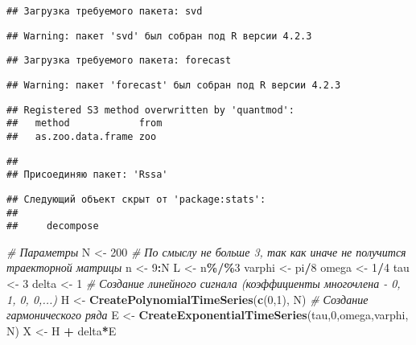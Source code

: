 \documentclass[
]{article}
\newenvironment{Shaded}{\begin{snugshade}}{\end{snugshade}}
\newcommand{\CommentTok}[1]{\textcolor[rgb]{0.56,0.35,0.01}{\textit{#1}}}
\newcommand{\DecValTok}[1]{\textcolor[rgb]{0.00,0.00,0.81}{#1}}
\newcommand{\FunctionTok}[1]{\textcolor[rgb]{0.13,0.29,0.53}{\textbf{#1}}}
\newcommand{\NormalTok}[1]{#1}
\newcommand{\OtherTok}[1]{\textcolor[rgb]{0.56,0.35,0.01}{#1}}
\newcommand{\SpecialCharTok}[1]{\textcolor[rgb]{0.81,0.36,0.00}{\textbf{#1}}}
\begin{document}
\begin{verbatim}
## Загрузка требуемого пакета: svd
\end{verbatim}

\begin{verbatim}
## Warning: пакет 'svd' был собран под R версии 4.2.3
\end{verbatim}

\begin{verbatim}
## Загрузка требуемого пакета: forecast
\end{verbatim}

\begin{verbatim}
## Warning: пакет 'forecast' был собран под R версии 4.2.3
\end{verbatim}

\begin{verbatim}
## Registered S3 method overwritten by 'quantmod':
##   method            from
##   as.zoo.data.frame zoo
\end{verbatim}

\begin{verbatim}
## 
## Присоединяю пакет: 'Rssa'
\end{verbatim}

\begin{verbatim}
## Следующий объект скрыт от 'package:stats':
## 
##     decompose
\end{verbatim}

\begin{Shaded}
\begin{Highlighting}[]
\CommentTok{\# Параметры}
\NormalTok{N }\OtherTok{\textless{}{-}} \DecValTok{200}
\CommentTok{\# По смыслу не больше 3, так как иначе не получится траекторной матрицы}
\NormalTok{n }\OtherTok{\textless{}{-}} \DecValTok{9}\SpecialCharTok{:}\NormalTok{N}
\NormalTok{L }\OtherTok{\textless{}{-}}\NormalTok{ n}\SpecialCharTok{\%/\%}\DecValTok{3}
\NormalTok{varphi }\OtherTok{\textless{}{-}}\NormalTok{ pi}\SpecialCharTok{/}\DecValTok{8}
\NormalTok{omega }\OtherTok{\textless{}{-}} \DecValTok{1}\SpecialCharTok{/}\DecValTok{4}
\NormalTok{tau }\OtherTok{\textless{}{-}} \DecValTok{3}
\NormalTok{delta }\OtherTok{\textless{}{-}} \DecValTok{1}
\CommentTok{\# Создание линейного сигнала (коэффициенты многочлена {-} 0, 1, 0, 0,...)}
\NormalTok{H }\OtherTok{\textless{}{-}} \FunctionTok{CreatePolynomialTimeSeries}\NormalTok{(}\FunctionTok{c}\NormalTok{(}\DecValTok{0}\NormalTok{,}\DecValTok{1}\NormalTok{), N)}
\CommentTok{\# Создание гармонического ряда}
\NormalTok{E }\OtherTok{\textless{}{-}} \FunctionTok{CreateExponentialTimeSeries}\NormalTok{(tau,}\DecValTok{0}\NormalTok{,omega,varphi, N)}
\NormalTok{X }\OtherTok{\textless{}{-}}\NormalTok{ H }\SpecialCharTok{+}\NormalTok{ delta}\SpecialCharTok{*}\NormalTok{E}
\end{Highlighting}
\end{Shaded}
\end{document}
